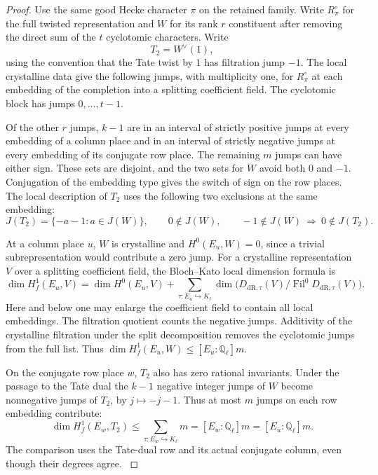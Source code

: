 \begin{proof}
Use the same good Hecke character \(\pi\) on the retained
family. Write \(R_\pi^\circ\) for the full twisted
representation and \(W\) for its rank \(r\) constituent
after removing the direct sum of the \(t\) cyclotomic
characters. Write
\[
 T_2=W^\vee(1),
\]
using the convention
that the Tate twist by \(1\) has filtration jump \(-1\).
The local crystalline data give the following jumps,
with multiplicity one, for \(R_\pi^\circ\) at each
embedding of the completion into a splitting coefficient
field. The cyclotomic block has jumps \(0,\ldots,t-1\).

Of the other \(r\) jumps, \(k-1\) are in an interval of
strictly positive jumps at every embedding of a column
place and in an interval of strictly negative jumps at
every embedding of its conjugate row place. The remaining
\(m\) jumps can have either sign. These sets are disjoint,
and the two sets for \(W\) avoid both \(0\) and \(-1\).
Conjugation of the embedding type gives the switch of
sign on the row places. The local description of \(T_2\)
uses the following two exclusions at the same embedding:
\begin{equation}\label{eq:split-row-zero-jump}
 J(T_2)=\{-a-1:a\in J(W)\},\qquad
 0\notin J(W),\qquad -1\notin J(W)\ \Longrightarrow\ 0\notin J(T_2).
\end{equation}

At a column place \(u\), \(W\) is crystalline and
\(H^0(E_u,W)=0\), since a trivial subrepresentation
would contribute a zero jump. For a crystalline representation
\(V\) over a splitting coefficient field, the
Bloch--Kato local dimension formula is
\[
 \dim H^1_f(E_u,V)=
 \dim H^0(E_u,V)+
 \sum_{\tau:E_u\hookrightarrow K_\ell}
    \dim \bigl(D_{\mathrm{dR},\tau}(V)/
                       \operatorname{Fil}^0 D_{\mathrm{dR},\tau}(V)\bigr).
\]
Here and below one may enlarge the coefficient field to
contain all local embeddings. The filtration quotient
counts the negative jumps. Additivity of the crystalline
filtration under the split decomposition removes the
cyclotomic jumps from the full list. Thus
\(\dim H^1_f(E_u,W)\le [E_u:\mathbb Q_\ell]m\).

On the conjugate row place \(w\), \(T_2\) also has zero
rational invariants. Under the passage to the Tate dual the
\(k-1\) negative integer jumps of \(W\) become
nonnegative jumps of \(T_2\), by \(j\mapsto -j-1\).
Thus at most \(m\) jumps on each row embedding contribute:
\[
 \dim H^1_f(E_w,T_2)
   \le \sum_{\tau:E_w\hookrightarrow K_\ell} m
   =[E_w:\mathbb Q_\ell]m=[E_u:\mathbb Q_\ell]m .
\]
The comparison uses the Tate-dual row and its actual conjugate
column, even though their degrees agree.
\cite[Corollary 3.8.4]{bloch-kato}


\end{proof}
